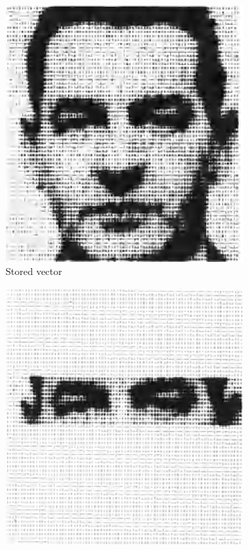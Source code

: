 \documentclass{article}
\begin{document}
\begin{figure}
     \centering
     \begin{subfigure}[b]{0.3\textwidth}
         \centering
         \includegraphics[width=\textwidth]{img/kohonenA.png}
         \caption{Stored vector}
         \label{kohonenA}
     \end{subfigure}
     \hfill
     \begin{subfigure}[b]{0.3\textwidth}
         \centering
         \includegraphics[width=\textwidth]{img/kohonenB.png}

\end{subfigure}
\end{figure}
\end{document}
